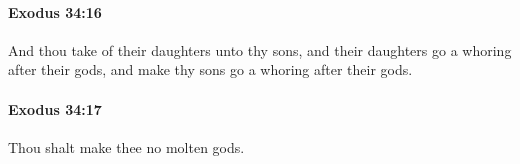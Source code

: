		\paragraph{Exodus 34:16} %
			\label{EXODUS-34-16}

			And thou take of their daughters unto thy sons, and their daughters go a whoring after their gods, and make thy sons go a whoring after their gods.


		\paragraph{Exodus 34:17} %
			\label{EXODUS-34-17}

			Thou shalt make thee no molten gods.


